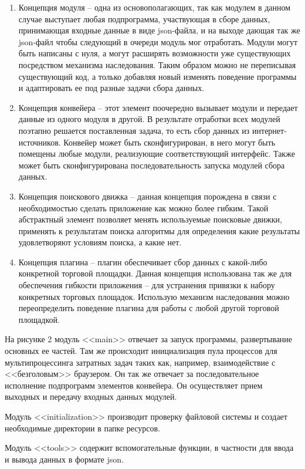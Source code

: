 \documentclass[../main]{subfiles}
\begin{document}
\begin{enumerate}
    \item Концепция модуля – одна из основополагающих, так как модулем в данном случае выступает любая подпрограмма, участвующая в сборе данных, принимающая входные данные в виде json-файла, и на выходе дающая так же json-файл чтобы следующий в очереди модуль мог отработать. Модули могут быть написаны с нуля, а могут расширять возможности уже существующих посредством механизма наследования. Таким образом можно не переписывая существующий код, а только добавляя новый изменять поведение программы и адаптировать ее под разные задачи сбора данных.
    \item Концепция конвейера – этот элемент поочередно вызывает модули и передает данные из одного модуля в другой. В результате отработки всех модулей поэтапно решается поставленная задача, то есть сбор данных из интернет-источников. Конвейер может быть сконфигурирован, в него могут быть помещены любые модули, реализующие соответствующий интерфейс. Также может быть сконфигурирована последовательность запуска модулей сбора данных.
    \item Концепция поискового движка – данная концепция порождена в связи с необходимостью сделать приложение как можно более гибким. Такой абстрактный элемент позволяет менять используемые поисковые движки, применять к результатам поиска алгоритмы для определения какие результаты удовлетворяют условиям поиска, а какие нет.
    \item Концепция плагина – плагин обеспечивает сбор данных с какой-либо конкретной торговой площадки. Данная концепция использована так же для обеспечения гибкости приложения – для устранения привязки к набору конкретных торговых площадок. Использую механизм наследования можно переопределить поведение плагина для работы с любой другой торговой площадкой. 
\end{enumerate}

На рисунке 2 модуль <<main>> отвечает за запуск программы, развертывание основных ее частей. Там же происходит инициализация пула процессов для мультипроцессинга затратных задач таких как, например, взаимодействие с <<безголовым>> браузером. Он так же отвечает за последовательное исполнение подпрограмм элементов конвейера. Он осуществляет прием выходных и передачу входных данных модулей.

Модуль <<initialization>> производит проверку файловой системы и создает необходимые директории в папке ресурсов.

Модуль <<tools>> содержит вспомогательные функции, в частности для ввода и вывода данных в формате json. 
\end{document}
